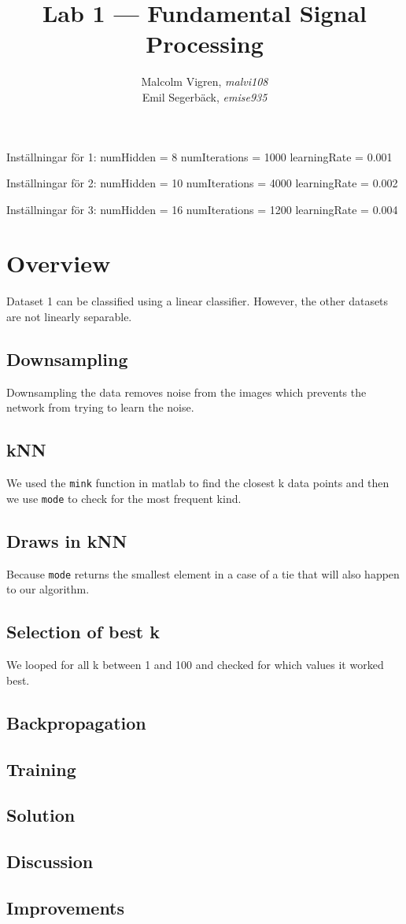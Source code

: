 \documentclass{IEEEtran}
\begin{document}
\title{Lab 1 --- Fundamental Signal Processing}
\author{Malcolm Vigren, \textit{malvi108} \\
        Emil Segerbäck, \textit{emise935}}

\maketitle

Inställningar för 1:
numHidden = 8
numIterations = 1000
learningRate = 0.001

Inställningar för 2:
numHidden = 10
numIterations = 4000
learningRate = 0.002

Inställningar för 3:
numHidden = 16
numIterations = 1200
learningRate = 0.004

\section{Overview}
Dataset 1 can be classified using a linear classifier. However, the other datasets are not
linearly separable.

\subsection{Downsampling}
Downsampling the data removes noise from the images which prevents the network from trying
to learn the noise.

\subsection{kNN}
We used the \texttt{mink} function in matlab to find the closest k data points and then we
use \texttt{mode} to check for the most frequent kind.

\subsection{Draws in kNN}
Because \texttt{mode} returns the smallest element in a case of a tie that will also
happen to our algorithm.

\subsection{Selection of best k}
We looped for all k between 1 and 100 and checked for which values it worked best.

\subsection{Backpropagation}


\subsection{Training}

\subsection{Solution}

\subsection{Discussion}

\subsection{Improvements}
\end{document}
